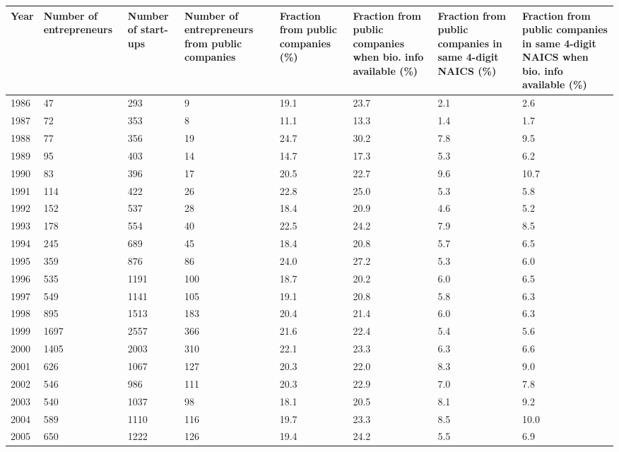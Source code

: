 \begin{table}[ht]
\centering
\begingroup\footnotesize
\begin{tabular}{p{1.75cm}p{1.75cm}p{1.75cm}p{1.75cm}p{1.75cm}p{1.75cm}p{1.75cm}p{1.75cm}}
  \toprule
Year & Number of entrepreneurs & Number of start-ups & Number of entrepreneurs from public companies & Fraction from public companies (\%) & Fraction from public companies when bio. info available (\%) & Fraction from public companies in same 4-digit NAICS (\%) & Fraction from public companies in same 4-digit NAICS when bio. info available (\%) \\ 
  \midrule
1986 & 47 & 293 &  9 & 19.1 & 23.7 & 2.1 & 2.6 \\ 
  1987 & 72 & 353 &  8 & 11.1 & 13.3 & 1.4 & 1.7 \\ 
  1988 & 77 & 356 & 19 & 24.7 & 30.2 & 7.8 & 9.5 \\ 
  1989 & 95 & 403 & 14 & 14.7 & 17.3 & 5.3 & 6.2 \\ 
  1990 & 83 & 396 & 17 & 20.5 & 22.7 & 9.6 & 10.7 \\ 
  1991 & 114 & 422 & 26 & 22.8 & 25.0 & 5.3 & 5.8 \\ 
  1992 & 152 & 537 & 28 & 18.4 & 20.9 & 4.6 & 5.2 \\ 
  1993 & 178 & 554 & 40 & 22.5 & 24.2 & 7.9 & 8.5 \\ 
  1994 & 245 & 689 & 45 & 18.4 & 20.8 & 5.7 & 6.5 \\ 
  1995 & 359 & 876 & 86 & 24.0 & 27.2 & 5.3 & 6.0 \\ 
  1996 & 535 & 1191 & 100 & 18.7 & 20.2 & 6.0 & 6.5 \\ 
  1997 & 549 & 1141 & 105 & 19.1 & 20.8 & 5.8 & 6.3 \\ 
  1998 & 895 & 1513 & 183 & 20.4 & 21.4 & 6.0 & 6.3 \\ 
  1999 & 1697 & 2557 & 366 & 21.6 & 22.4 & 5.4 & 5.6 \\ 
  2000 & 1405 & 2003 & 310 & 22.1 & 23.3 & 6.3 & 6.6 \\ 
  2001 & 626 & 1067 & 127 & 20.3 & 22.0 & 8.3 & 9.0 \\ 
  2002 & 546 & 986 & 111 & 20.3 & 22.9 & 7.0 & 7.8 \\ 
  2003 & 540 & 1037 & 98 & 18.1 & 20.5 & 8.1 & 9.2 \\ 
  2004 & 589 & 1110 & 116 & 19.7 & 23.3 & 8.5 & 10.0 \\ 
  2005 & 650 & 1222 & 126 & 19.4 & 24.2 & 5.5 & 6.9 \\ 

\end{tabular}
\end{table}
